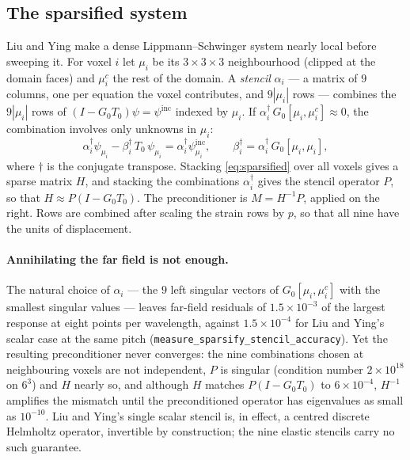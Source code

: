 \documentclass[11pt,a4paper]{article}
\newcommand{\Tz}{T_0}
\newcommand{\Gz}{G_0}
\begin{document}
\subsection{The sparsified system}

Liu and Ying \cite{LiuYing2018} make a dense Lippmann--Schwinger system nearly local before
sweeping it. For voxel $i$ let $\mu_i$ be its $3\times3\times3$ neighbourhood (clipped at the
domain faces) and $\mu_i^{c}$ the rest of the domain. A \emph{stencil} $\alpha_i$ --- a matrix of
$9$ columns, one per equation the voxel contributes, and $9|\mu_i|$ rows --- combines the $9|\mu_i|$
rows of $(I-\Gz\Tz)\psi = \psi^{\mathrm{inc}}$ indexed by $\mu_i$. If
$\alpha_i^{\dagger}\,\Gz[\mu_i,\mu_i^{c}] \approx 0$, the combination involves only unknowns
in $\mu_i$:
\begin{equation}
\alpha_i^{\dagger}\psi_{\mu_i} - \beta_i^{\dagger}\,\Tz\,\psi_{\mu_i} = \alpha_i^{\dagger}\psi^{\mathrm{inc}}_{\mu_i},
\qquad \beta_i^{\dagger} = \alpha_i^{\dagger}\,\Gz[\mu_i,\mu_i],
\label{eq:sparsified}
\end{equation}
where $\dagger$ is the conjugate transpose. Stacking \eqref{eq:sparsified} over all voxels gives
a sparse matrix $H$, and stacking the combinations $\alpha_i^{\dagger}$ gives the stencil operator
$P$, so that $H \approx P(I-\Gz\Tz)$. The preconditioner is $M = H^{-1}P$, applied on the right.
Rows are combined after scaling the strain rows by $p$, so that all nine have the units of
displacement.

\paragraph{Annihilating the far field is not enough.} The natural choice of $\alpha_i$ --- the
$9$ left singular vectors of $\Gz[\mu_i,\mu_i^{c}]$ with the smallest singular values --- leaves
far-field residuals of $1.5\times10^{-3}$ of the largest response at eight points per
wavelength, against $1.5\times10^{-4}$ for Liu and Ying's scalar case at the same pitch
(\texttt{measure\_sparsify\_stencil\_accuracy}). Yet the resulting preconditioner never
converges: the nine combinations chosen at neighbouring voxels are not independent, $P$ is
singular (condition number $2\times10^{18}$ on $6^3$) and $H$ nearly so, and although
$H$ matches $P(I-\Gz\Tz)$ to $6\times10^{-4}$, $H^{-1}$ amplifies the mismatch until the
preconditioned operator has eigenvalues as small as $10^{-10}$. Liu and Ying's single scalar
stencil is, in effect, a centred discrete Helmholtz operator, invertible by construction; the
nine elastic stencils carry no such guarantee.
\end{document}
